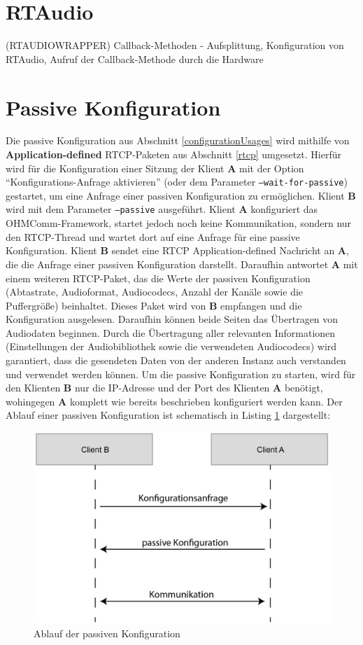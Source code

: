 \section{RTAudio}
(RTAUDIOWRAPPER) Callback-Methoden - Aufsplittung, Konfiguration von RTAudio, Aufruf der Callback-Methode durch die Hardware

\FloatBarrier
\section{Passive Konfiguration}
\label{passiveConfiguration}
Die passive Konfiguration aus Abschnitt \ref{configurationUsages} wird mithilfe von \textbf{Application-defined} RTCP-Paketen aus Abschnitt \ref{rtcp} umgesetzt. Hierfür wird für die Konfiguration einer Sitzung der Klient \textbf{A} mit der Option \enquote{Konfigurations-Anfrage aktivieren} (oder dem Parameter \texttt{--wait-for-passive}) gestartet, um eine Anfrage einer passiven Konfiguration zu ermöglichen. Klient \textbf{B} wird mit dem Parameter \texttt{--passive} ausgeführt. Klient \textbf{A} konfiguriert das OHMComm-Framework, startet jedoch noch keine Kommunikation, sondern nur den RTCP-Thread und wartet dort auf eine Anfrage für eine passive Konfiguration. Klient \textbf{B} sendet eine RTCP Application-defined Nachricht an \textbf{A}, die die Anfrage einer passiven Konfiguration darstellt. Daraufhin antwortet \textbf{A} mit einem weiteren RTCP-Paket, das die Werte der passiven Konfiguration (Abtastrate, Audioformat, Audiocodecs, Anzahl der Kanäle sowie die Puffergröße) beinhaltet. Dieses Paket wird von \textbf{B} empfangen und die Konfiguration ausgelesen. Daraufhin können beide Seiten das Übertragen von Audiodaten beginnen. Durch die Übertragung aller relevanten Informationen (Einstellungen der Audiobibliothek sowie die verwendeten Audiocodecs) wird garantiert, dass die gesendeten Daten von der anderen Instanz auch verstanden und verwendet werden können. Um die passive Konfiguration zu starten, wird für den Klienten \textbf{B} nur die IP-Adresse und der Port des Klienten \textbf{A} benötigt, wohingegen \textbf{A} komplett wie bereits beschrieben konfiguriert werden kann. Der Ablauf einer passiven Konfiguration ist schematisch in Listing \ref{lst:passiveConfiguration} dargestellt:
\newline
\begin{figure}[htp]
\centering
\includegraphics[width=.75\textwidth]{../img/passiveConfiguration}
\caption{Ablauf der passiven Konfiguration}
\label{lst:passiveConfiguration}
\end{figure}

